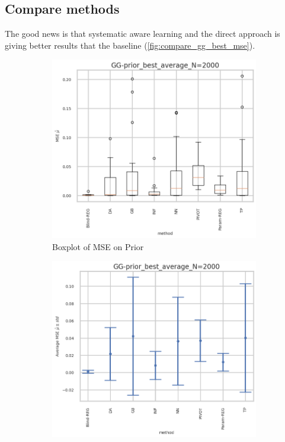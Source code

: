 \subsection{Compare methods} %
\label{sub:compare_methods}


The good news is that systematic aware learning and the direct approach is giving better results that the baseline (\autoref{fig:compare_gg_best_mse}).

\begin{figure}[ht!]
  \centering
  \begin{subfigure}[t]{0.49\linewidth}
    \includegraphics[width=\linewidth]{COMPARE/GG-prior/BEST_MSE/GG-prior_best_average_N=2000-boxplot_mse.png}
    \caption{Boxplot of MSE on Prior}
  \end{subfigure}%
  \hfill
  \begin{subfigure}[t]{0.49\linewidth}
    \includegraphics[width=\linewidth]{COMPARE/GG-prior/BEST_MSE/GG-prior_best_average_N=2000-errplot_mse.png}

\end{subfigure}
\end{figure}
